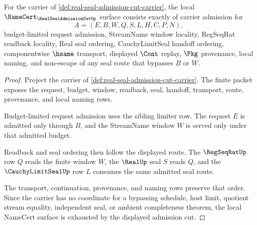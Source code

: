 \begin{theorem}
\label{thm:real-seal-admission-cut-namecert-obligations}
For the carrier of \autoref{def:real-seal-admission-cut-carrier}, the local $\NameCert_{\RealSealAdmissionCutUp}$ surface consists exactly of carrier admission for
$$
A=(E,B,W,Q,S,L,H,C,P,N),
$$
budget-limited request admission, StreamName window locality, RegSeqRat readback locality, Real seal ordering, CauchyLimitSeal handoff ordering, componentwise $\hsame$ transport, displayed $\Cont$ replay, $\Pkg$ provenance, local naming, and non-escape of any seal route that bypasses $B$ or $W$.
\end{theorem}
\begin{proof}
Project the carrier of \autoref{def:real-seal-admission-cut-carrier}. The finite packet exposes the request, budget, window, readback, seal, handoff, transport, route, provenance, and local naming rows.

Budget-limited request admission uses the sibling limiter row. The request $E$ is admitted only through $B$, and the StreamName window $W$ is served only under that admitted budget.

Readback and seal ordering then follow the displayed route. The $\RegSeqRatUp$ row $Q$ reads the finite window $W$, the $\RealUp$ seal $S$ reads $Q$, and the $\CauchyLimitSealUp$ row $L$ consumes the same admitted seal route.

The transport, continuation, provenance, and naming rows preserve that order. Since the carrier has no coordinate for a bypassing schedule, host limit, quotient stream equality, independent seal, or ambient completeness theorem, the local NameCert surface is exhausted by the displayed admission cut.
\end{proof}

